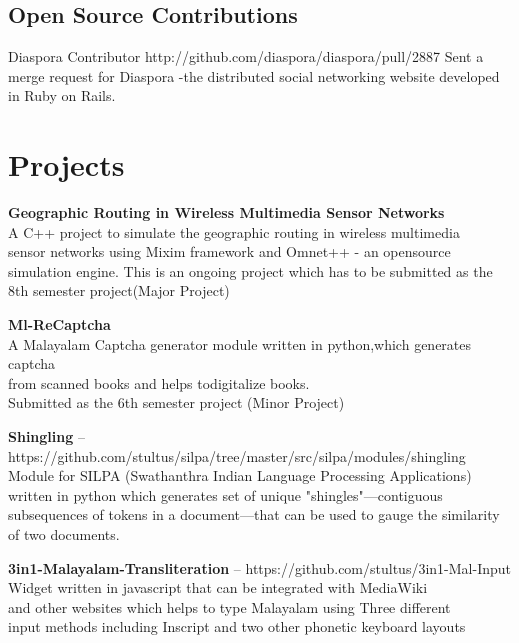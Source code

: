 \documentclass[11pt,a4paper]{moderncv}
\begin{document}
\subsection{Open Source Contributions}

\cventry
         {}
         {Diaspora}
         {Contributor}
         {}
         {http://github.com/diaspora/diaspora/pull/2887}
         {
          Sent a merge request for Diaspora -the distributed social
          networking website developed in Ruby on Rails. }



\section{Projects}

\cvlistitem
{\textbf{Geographic Routing in Wireless Multimedia Sensor Networks}  
  \\A C++ project to simulate the geographic routing in wireless multimedia \\
    sensor networks using Mixim framework and Omnet++ - an opensource simulation engine.
    This is an ongoing project which has to be submitted as the 8th semester project(Major Project) \\
}

\cvlistitem
{\textbf{Ml-ReCaptcha}  
  \\A Malayalam Captcha generator module written in python,which generates captcha\\
    from scanned books and helps todigitalize books.\\
    Submitted as the 6th semester project (Minor Project) \\
}

\cvlistitem
{\textbf{Shingling} -- {\small https://github.com/stultus/silpa/tree/master/src/silpa/modules/shingling}
  \\Module for SILPA (Swathanthra Indian Language Processing Applications)\\
    written in python which generates set of unique "shingles"—contiguous  \\
    subsequences of tokens in a document—that can be used to gauge the similarity of two documents.\\
}

\cvlistitem
{\textbf{3in1-Malayalam-Transliteration} -- {\small https://github.com/stultus/3in1-Mal-Input}
  \\Widget written in javascript that can be integrated with MediaWiki \\
    and other websites which helps to type Malayalam using Three different\\
    input methods including Inscript and two other phonetic keyboard layouts
}
\end{document}
